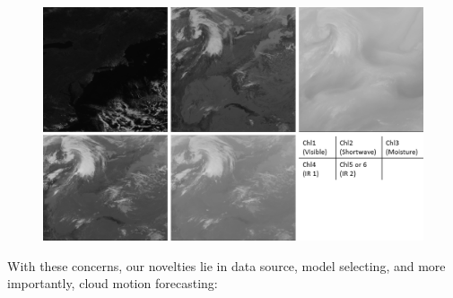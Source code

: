 \documentclass[conference]{IEEEtran}
\begin{document}


\begin{figure}[tb]
\centering
\includegraphics[width=2.5 in]{multi_chl}
\label{fig:multichl}
\end{figure}

With these concerns, our novelties lie in data source, model selecting, and more
importantly, cloud motion forecasting:
 
\end{document}
